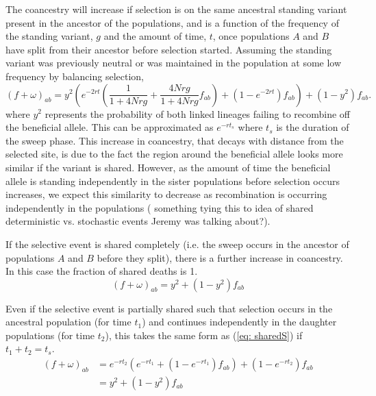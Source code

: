 \documentclass[a4paper,10pt]{article}
\newcommand{\kl}[1]{{\color{orange} #1}}
\begin{document}
The coancestry will increase if selection is on the same ancestral standing variant present in the ancestor of the populations, and is a function of the frequency of the standing variant, $g$ and the amount of time, $t$, once populations $A$ and $B$ have split from their ancestor before selection started. Assuming the standing variant was previously neutral or was maintained in the population at some low frequency by balancing selection,
\begin{equation} 
(f+\omega)_{ab} = y^2 \left(e^{-2rt} \left(\frac{1}{1+4Nrg}+ \frac{4Nrg}{1+4Nrg}f_{ab} \right) + (1-e^{-2rt})f_{ab} \right) + (1-y^2)f_{ab}. 
\end{equation}
where $y^2$ represents the probability of both linked lineages failing to recombine off the beneficial allele. This can be approximated as $e^{-rt_s}$ where $t_s$ is the duration of the sweep phase. This increase in coancestry, that decays with distance from the selected site, is due to the fact the region around the beneficial allele looks more similar if the variant is shared. However, as the amount of time the beneficial allele is standing independently in the sister populations before selection occurs increases, we expect this similarity to decrease as recombination is occurring independently in the populations (\kl{something tying this to idea of shared deterministic vs. stochastic events Jeremy was talking about?}).

If the selective event is shared completely (i.e. the sweep occurs in the ancestor of populations $A$ and $B$ before they split), there is a further increase in coancestry. In this case the fraction of shared deaths is 1.
\begin{equation} \label{eq: sharedS}
(f+\omega)_{ab} = y^2 + (1-y^2) f_{ab}
\end{equation}

Even if the selective event is partially shared such that selection occurs in the ancestral population (for time $t_1$) and continues independently in the daughter populations (for time $t_2$), this takes the same form as (\ref{eq: sharedS}) if $t_1 + t_2 = t_s$.
\begin{equation} \label{eq: sharedS}
\begin{split}
(f+\omega)_{ab} &= e^{-rt_2}\left(e^{-rt_1} + (1-e^{-rt_1})f_{ab}\right) + (1-e^{-rt_2})f_{ab} \\
 & = y^2 + (1-y^2) f_{ab}
 \end{split}
\end{equation}
\end{document}
